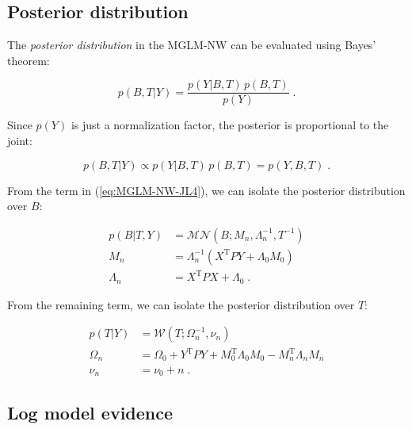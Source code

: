 \subsection{Posterior distribution} \label{sec:MGLM-NW-post}

The \textit{posterior distribution} in the MGLM-NW can be evaluated using Bayes' theorem:

\begin{equation} \label{eq:MGLM-NW-BT}
p(B,T|Y) = \frac{p(Y|B,T) \, p(B,T)}{p(Y)} \; .
\end{equation}

Since $p(Y)$ is just a normalization factor, the posterior is proportional to the joint:

\begin{equation} \label{eq:MGLM-NW-post-JL}
p(B,T|Y) \propto p(Y|B,T) \, p(B,T) = p(Y,B,T) \; .
\end{equation}

From the term in (\ref{eq:MGLM-NW-JL4}), we can isolate the posterior distribution over $B$:

\vspace{-0.5em}
\begin{equation} \label{eq:MGLM-NW-post-B}
\begin{split}
p(B|T,Y) &= \mathcal{MN}(B; M_n, \Lambda_n^{-1}, T^{-1}) \\
M_n &= \Lambda_n^{-1} (X^\mathrm{T} P Y + \Lambda_0 M_0) \\
\Lambda_n &= X^\mathrm{T} P X + \Lambda_0 \; .
\end{split}
\end{equation}

From the remaining term, we can isolate the posterior distribution over $T$:

\vspace{-0.5em}
\begin{equation} \label{eq:MGLM-NW-post-T}
\begin{split}
p(T|Y) &= \mathcal{W}(T; \Omega_n^{-1}, \nu_n) \\
\Omega_n &= \Omega_0 + Y^\mathrm{T} P Y + M_0^\mathrm{T} \Lambda_0 M_0 - M_n^\mathrm{T} \Lambda_n M_n \\
\nu_n &= \nu_0 + n \; .
\end{split}
\end{equation}


\pagebreak
\subsection{Log model evidence} \label{sec:MGLM-NW-LME}

